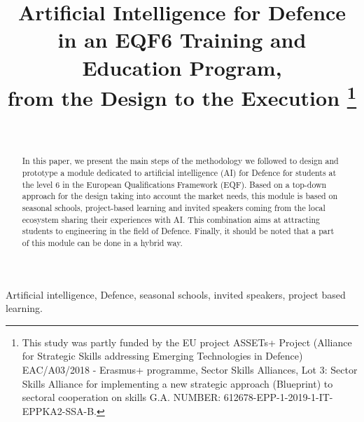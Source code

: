\documentclass[conference]{IEEEtran}
\begin{document}
\title{Artificial Intelligence for Defence \\in an EQF6 Training and Education Program,\\ from the Design to the Execution
\thanks{This study was partly funded by the EU project ASSETs+ Project (Alliance for Strategic Skills addressing Emerging Technologies in Defence) EAC/A03/2018 - Erasmus+ programme, Sector Skills Alliances, Lot 3: Sector Skills Alliance for implementing a new strategic approach (Blueprint) to sectoral cooperation on skills G.A. NUMBER: 612678-EPP-1-2019-1-IT-EPPKA2-SSA-B.}
}

\author{
\and
{}
\\
\and
{}
}

\maketitle
\begin{abstract}
In this paper, we present the main steps of the methodology we followed to design and prototype a module dedicated to artificial intelligence (AI) for Defence for students at the level 6 in the European Qualifications Framework (EQF). Based on a top-down approach for the design taking into account the market needs, this module is based on seasonal schools, project-based learning and invited speakers coming from the local ecosystem sharing their experiences with AI. This combination aims at attracting students to engineering in the field of Defence. Finally, it should be noted that a part of this module can be done in a hybrid way. \end{abstract}

\begin{IEEEkeywords}
Artificial intelligence, Defence, seasonal schools, invited speakers, project based learning.
\end{IEEEkeywords}
\end{document}
